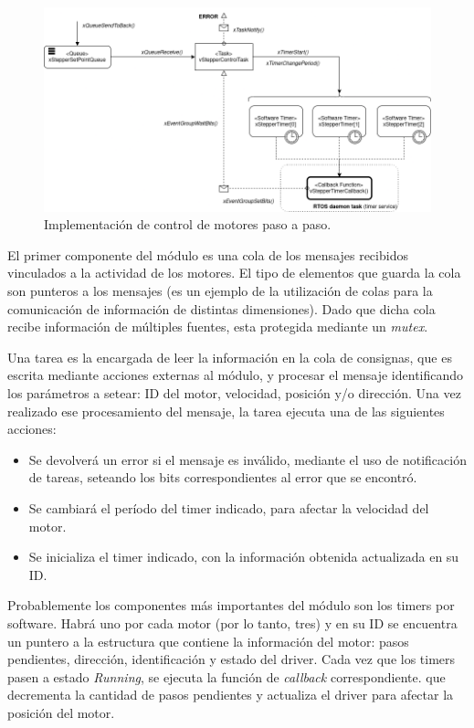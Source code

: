 \documentclass{IEEEtran}
\begin{document}
\begin{figure}[ht]
    \centering
    \includegraphics[scale=0.5]{../diagrama_stepper.png}
    \caption{Implementación de control de motores paso a paso.}
    \label{fig:diagrama-stepper}
\end{figure}

El primer componente del módulo es una cola de los mensajes recibidos vinculados a la actividad de los motores. El tipo de elementos que guarda la cola son punteros a los mensajes (es un ejemplo de la utilización de colas para la comunicación de información de distintas dimensiones). Dado que dicha cola recibe información de múltiples fuentes, esta protegida mediante un \textit{mutex}.

Una tarea es la encargada de leer la información en la cola de consignas, que es escrita mediante acciones externas al módulo, y procesar el mensaje identificando los parámetros a setear: ID del motor, velocidad, posición y/o dirección. Una vez realizado ese procesamiento del mensaje, la tarea ejecuta una de las siguientes acciones:

\begin{itemize}
    \item Se devolverá un error si el mensaje es inválido, mediante el uso de notificación de tareas, seteando los bits correspondientes al error que se encontró.
    \item Se cambiará el período del timer indicado, para afectar la velocidad del motor.
    \item Se inicializa el timer indicado, con la información obtenida actualizada en su ID.
\end{itemize}

Probablemente los componentes más importantes del módulo son los timers por software. Habrá uno por cada motor (por lo tanto, tres) y en su ID se encuentra un puntero a la estructura que contiene la información del motor: pasos pendientes, dirección, identificación y estado del driver. Cada vez que los timers pasen a estado \textit{Running}, se ejecuta la función de \textit{callback} correspondiente. que decrementa la cantidad de pasos pendientes y actualiza el driver para afectar la posición del motor. 
\end{document}
